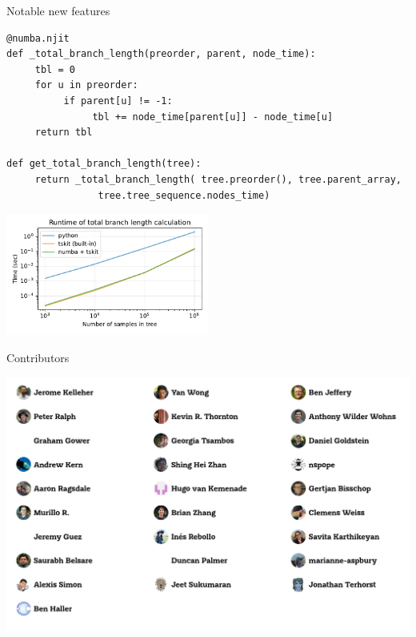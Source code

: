 \documentclass[landscape,a0paper,fontscale=0.4]{baposter}
\begin{document}
\begin{poster}
\begin{posterbox}[name=operations,column=3,below=stats,span=1]{Notable new features}
\begin{verbatim}
@numba.njit
def _total_branch_length(preorder, parent, node_time):
     tbl = 0
     for u in preorder:
          if parent[u] != -1:
               tbl += node_time[parent[u]] - node_time[u]
     return tbl

def get_total_branch_length(tree):
     return _total_branch_length( tree.preorder(), tree.parent_array,
                tree.tree_sequence.nodes_time)
\end{verbatim}
\includegraphics[width=0.5\textwidth]{numba_runtime}

\end{posterbox}



\begin{posterbox}[name=refs,column=1,above=bottom]{Contributors}

    \includegraphics[width=\textwidth]{tskit-contributors}


\end{posterbox}


\end{poster}%
\end{document}
